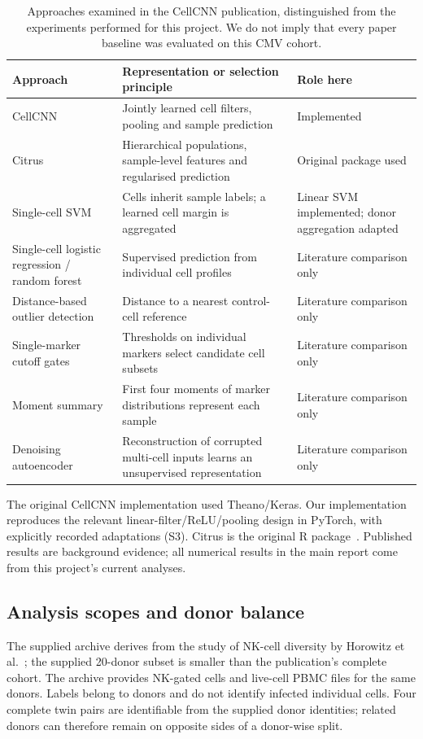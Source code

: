 \documentclass[11pt,a4paper]{article}
\begin{document}
\begin{table}[htb]\centering\small
\begin{tabular}{@{}>{\raggedright\arraybackslash}p{.22\linewidth}>{\raggedright\arraybackslash}p{.48\linewidth}>{\raggedright\arraybackslash}p{.24\linewidth}@{}}\toprule
Approach & Representation or selection principle & Role here\\\midrule
CellCNN & Jointly learned cell filters, pooling and sample prediction & Implemented\\
Citrus & Hierarchical populations, sample-level features and regularised prediction & Original package used\\
Single-cell SVM & Cells inherit sample labels; a learned cell margin is aggregated & Linear SVM implemented; donor aggregation adapted\\
Single-cell logistic regression / random forest & Supervised prediction from individual cell profiles & Literature comparison only\\
Distance-based outlier detection & Distance to a nearest control-cell reference & Literature comparison only\\
Single-marker cutoff gates & Thresholds on individual markers select candidate cell subsets & Literature comparison only\\
Moment summary & First four moments of marker distributions represent each sample & Literature comparison only\\
Denoising autoencoder & Reconstruction of corrupted multi-cell inputs learns an unsupervised representation & Literature comparison only\\\bottomrule
\end{tabular}
\caption{Approaches examined in the CellCNN publication, distinguished from the experiments performed for this project. We do not imply that every paper baseline was evaluated on this CMV cohort.}
\end{table}

The original CellCNN implementation used Theano/Keras. Our implementation reproduces the relevant linear-filter/ReLU/pooling design in PyTorch, with explicitly recorded adaptations (S3). Citrus is the original R package~\cite{citrus}. Published results are background evidence; all numerical results in the main report come from this project's current analyses.

\subsection{Analysis scopes and donor balance}
The supplied archive derives from the study of NK-cell diversity by Horowitz et al.~\cite{horowitz}; the supplied 20-donor subset is smaller than the publication's complete cohort. The archive provides NK-gated cells and live-cell PBMC files for the same donors. Labels belong to donors and do not identify infected individual cells. Four complete twin pairs are identifiable from the supplied donor identities; related donors can therefore remain on opposite sides of a donor-wise split.
\end{document}
